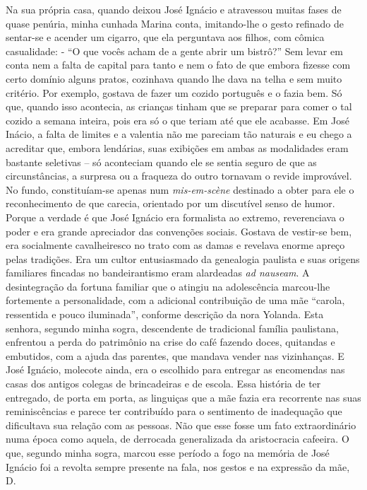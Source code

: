 Na sua própria casa, quando deixou José Ignácio e atravessou muitas fases de quase penúria, minha cunhada Marina conta, imitando-lhe o gesto refinado de sentar-se e acender um cigarro, que ela perguntava aos filhos, com cômica casualidade: - ``O que vocês acham de a gente abrir um bistrô?'' Sem levar em conta nem a falta de capital para tanto e nem o fato de que embora fizesse com certo domínio alguns pratos, cozinhava quando lhe dava na telha e sem muito critério.
Por exemplo, gostava de fazer um cozido português e o fazia bem.
Só que, quando isso acontecia, as crianças tinham que se preparar para comer o tal cozido a semana inteira, pois era só o que teriam até que ele acabasse.
Em José Inácio, a falta de limites e a valentia não me pareciam tão naturais e eu chego a acreditar que, embora lendárias, suas exibições em ambas as modalidades eram bastante seletivas -- só aconteciam quando ele se sentia seguro de que as circunstâncias, a surpresa ou a fraqueza do outro tornavam o revide improvável.
No fundo, constituíam-se apenas num \textit{mis-em-scène} destinado a obter para ele o reconhecimento de que carecia, orientado por um discutível senso de humor.
Porque a verdade é que José Ignácio era formalista ao extremo, reverenciava o poder e era grande apreciador das convenções sociais.
Gostava de vestir-se bem, era socialmente cavalheiresco no trato com as damas e revelava enorme apreço pelas tradições.
Era um cultor entusiasmado da genealogia paulista e suas origens familiares fincadas no bandeirantismo eram alardeadas \textit{ad nauseam}.
A desintegração da fortuna familiar que o atingiu na adolescência marcou-lhe fortemente a personalidade, com a adicional contribuição de uma mãe ``carola, ressentida e pouco iluminada'', conforme descrição da nora Yolanda.
Esta senhora, segundo minha sogra, descendente de tradicional família paulistana, enfrentou a perda do patrimônio na crise do café fazendo doces, quitandas e embutidos, com a ajuda das parentes, que mandava vender nas vizinhanças.
E José Ignácio, molecote ainda, era o escolhido para entregar as encomendas nas casas dos antigos colegas de brincadeiras e de escola.
Essa história de ter entregado, de porta em porta, as linguiças que a mãe fazia era recorrente nas suas reminiscências e parece ter contribuído para o sentimento de inadequação que dificultava sua relação com as pessoas.
Não que esse fosse um fato extraordinário numa época como aquela, de derrocada generalizada da aristocracia cafeeira.
O que, segundo minha sogra, marcou esse período a fogo na memória de José Ignácio foi a revolta sempre presente na fala, nos gestos e na expressão da mãe, D.
